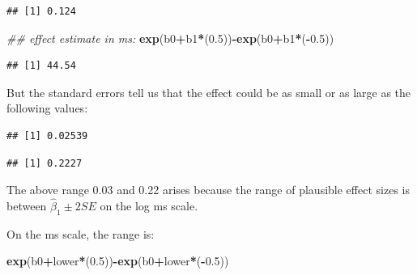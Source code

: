 \documentclass[12pt,]{krantz}
\newenvironment{Shaded}{\begin{snugshade}}{\end{snugshade}}
\newcommand{\CommentTok}[1]{\textcolor[rgb]{0.56,0.35,0.01}{\textit{#1}}}
\newcommand{\DecValTok}[1]{\textcolor[rgb]{0.00,0.00,0.81}{#1}}
\newcommand{\FloatTok}[1]{\textcolor[rgb]{0.00,0.00,0.81}{#1}}
\newcommand{\KeywordTok}[1]{\textcolor[rgb]{0.13,0.29,0.53}{\textbf{#1}}}
\newcommand{\NormalTok}[1]{#1}
\newcommand{\OperatorTok}[1]{\textcolor[rgb]{0.81,0.36,0.00}{\textbf{#1}}}
\begin{document}
\begin{verbatim}
## [1] 0.124
\end{verbatim}

\begin{Shaded}
\begin{Highlighting}[]
\CommentTok{## effect estimate in ms:}
\KeywordTok{exp}\NormalTok{(b0}\OperatorTok{+}\NormalTok{b1}\OperatorTok{*}\NormalTok{(}\FloatTok{0.5}\NormalTok{))}\OperatorTok{-}\KeywordTok{exp}\NormalTok{(b0}\OperatorTok{+}\NormalTok{b1}\OperatorTok{*}\NormalTok{(}\OperatorTok{-}\FloatTok{0.5}\NormalTok{))}
\end{Highlighting}
\end{Shaded}

\begin{verbatim}
## [1] 44.54
\end{verbatim}

But the standard errors tell us that the effect could be as small or as large as the following values:

\begin{Shaded}
\end{Shaded}

\begin{verbatim}
## [1] 0.02539
\end{verbatim}

\begin{verbatim}
## [1] 0.2227
\end{verbatim}

The above range 0.03 and 0.22 arises because the range of plausible effect sizes is between \(\hat\beta_1 \pm 2SE\) on the log ms scale.

On the ms scale, the range is:

\begin{Shaded}
\begin{Highlighting}[]
\KeywordTok{exp}\NormalTok{(b0}\OperatorTok{+}\NormalTok{lower}\OperatorTok{*}\NormalTok{(}\FloatTok{0.5}\NormalTok{))}\OperatorTok{-}\KeywordTok{exp}\NormalTok{(b0}\OperatorTok{+}\NormalTok{lower}\OperatorTok{*}\NormalTok{(}\OperatorTok{-}\FloatTok{0.5}\NormalTok{))}
\end{Highlighting}
\end{Shaded}
\end{document}
